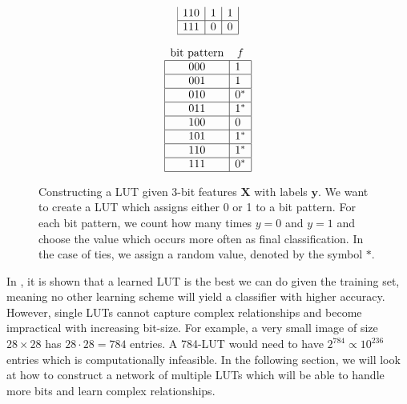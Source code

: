 \begin{figure}[!htb]
\begin{minipage}{.95\linewidth}
\begin{minipage}[b]{.4\linewidth}
\begin{align*}
\begin{array}{ccc}
        \multicolumn{1}{|c|}{110} & \multicolumn{1}{c|}{1} & \multicolumn{1}{c|}{1}                \\ \hline
        \multicolumn{1}{|c|}{111} & \multicolumn{1}{c|}{0} & \multicolumn{1}{c|}{0}                \\ \hline
      \end{array}
    \end{align*}
  \end{minipage}
  \begin{minipage}[b]{.3\linewidth}\centering
    \begin{align*}
      \begin{array}{cc}
        \text{bit pattern}        & f                  \\ \hline
        \multicolumn{1}{|c|}{000} & \multicolumn{1}{l|}{1}   \\ \hline
        \multicolumn{1}{|c|}{001} & \multicolumn{1}{l|}{1}   \\ \hline
        \multicolumn{1}{|c|}{010} & \multicolumn{1}{l|}{0^*} \\ \hline
        \multicolumn{1}{|c|}{011} & \multicolumn{1}{l|}{1^*} \\ \hline
        \multicolumn{1}{|c|}{100} & \multicolumn{1}{l|}{0}   \\ \hline
        \multicolumn{1}{|c|}{101} & \multicolumn{1}{l|}{1^*}  \\ \hline
        \multicolumn{1}{|c|}{110} & \multicolumn{1}{l|}{1^*}  \\ \hline
        \multicolumn{1}{|c|}{111} & \multicolumn{1}{l|}{0^*} \\ \hline
      \end{array}
    \end{align*}
  \end{minipage}
  \caption{Constructing a LUT given 3-bit features $\bm{X}$ with labels $\bm{y}$. We want to create a LUT which assigns either 0 or 1 to a bit pattern. For each bit pattern, we count how many times $y=0$ and $y=1$ and choose the value which occurs more often as final classification. In the case of ties, we assign a random value, denoted by the symbol $*$.}
  \label{ex:1}
\end{minipage}
  \normalfont
  \end{figure}
\FloatBarrier

\noindent In \cite{bib:chatterjee2018learning}, it is shown that a learned LUT is the best we can do given the training set, meaning no other learning scheme will yield a classifier with higher accuracy. However, single LUTs cannot capture complex relationships and become impractical with increasing bit-size. For example, a very small image of size $28 \times 28$ has $28 \cdot 28 = 784$ entries. A 784-LUT would need to have $2^{784} \propto 10^{236}$ entries which is computationally infeasible. In the following section, we will look at how to construct a network of multiple LUTs which will be able to handle more bits and learn complex relationships.


